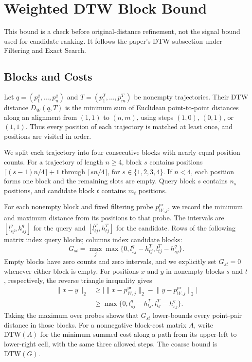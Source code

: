 \documentclass[10pt,conference,letterpaper]{IEEEtran}
\begin{document}
\section{Weighted DTW Block Bound}
\label{app:block}

This bound is a check before original-distance refinement, not the signal
bound used for candidate ranking. It follows the paper's DTW subsection
under Filtering and Exact Search.

\subsection{Blocks and Costs}
Let $q=(p_1^q,\ldots,p_n^q)$ and $T=(p_1^T,\ldots,p_m^T)$ be nonempty
trajectories. Their DTW distance $D_W(q,T)$ is the minimum sum of Euclidean
point-to-point distances along an alignment from $(1,1)$ to $(n,m)$, using
steps $(1,0)$, $(0,1)$, or $(1,1)$. Thus every position of each trajectory is
matched at least once, and positions are visited in order.

We split each trajectory into four consecutive blocks with nearly equal
position counts. For a trajectory of length $n\geq4$, block $s$ contains
positions $\lceil(s-1)n/4\rceil+1$ through $\lceil sn/4\rceil$, for
$s\in\{1,2,3,4\}$. If $n<4$, each position forms one block and the remaining
slots are empty. Query block $s$ contains $n_s$ positions, and candidate block
$t$ contains $m_t$ positions.

For each nonempty block and fixed filtering probe $p_{W,j}^{\mathrm{pr}}$,
we record the minimum and maximum distance from its positions to that probe.
The intervals are $[l^q_{sj},h^q_{sj}]$ for the query and $[l^T_{tj},h^T_{tj}]$
for the candidate. Rows of the following matrix index query blocks; columns
index candidate blocks:
\begin{equation}
G_{st}=\max_j\max\{0,l^q_{sj}-h^T_{tj},l^T_{tj}-h^q_{sj}\}.
\end{equation}
Empty blocks have zero counts and zero intervals, and we explicitly set
$G_{st}=0$ whenever either block is empty. For positions $x$ and $y$ in
nonempty blocks $s$ and $t$, respectively, the reverse triangle inequality gives
\begin{equation}
\begin{aligned}
\lVert x-y\rVert_2
&\geq\bigl|\lVert x-p_{W,j}^{\mathrm{pr}}\rVert_2
          -\lVert y-p_{W,j}^{\mathrm{pr}}\rVert_2\bigr|\\
&\geq\max\{0,l^q_{sj}-h^T_{tj},l^T_{tj}-h^q_{sj}\}.
\end{aligned}
\end{equation}
Taking the maximum over probes shows that $G_{st}$ lower-bounds every
point-pair distance in those blocks. For a nonnegative block-cost matrix $A$,
write $\mathrm{DTW}(A)$ for the minimum summed cost along a path from its
upper-left to lower-right cell, with the same three allowed steps.
The coarse bound is $\mathrm{DTW}(G)$.
\end{document}
